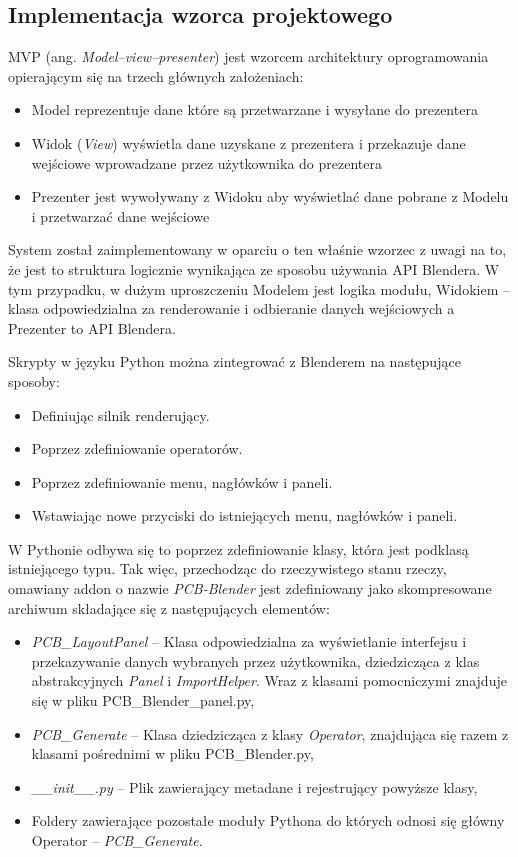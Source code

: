 \documentclass[brudnopis]{xmgr}
\begin{document}
\subsection{Implementacja wzorca projektowego} \label{mvp}
MVP (ang. \emph{Model–view–presenter}) jest wzorcem architektury oprogramowania opierającym się na trzech głównych założeniach:\cite{mvp}
\begin{itemize}
\item Model reprezentuje dane które są przetwarzane i wysyłane do prezentera
\item Widok (\emph{View}) wyświetla dane uzyskane z prezentera i przekazuje dane wejściowe wprowadzane przez użytkownika do prezentera
\item Prezenter jest wywoływany z Widoku aby wyświetlać dane pobrane z Modelu i przetwarzać dane wejściowe
\end{itemize}
System został zaimplementowany w oparciu o ten właśnie wzorzec z uwagi na to, że jest to struktura logicznie wynikająca ze sposobu używania API Blendera.
W tym przypadku, w dużym uproszczeniu Modelem jest logika modułu, Widokiem -- klasa odpowiedzialna za renderowanie i odbieranie danych wejściowych a Prezenter to API Blendera.
\newline


Skrypty w języku Python można zintegrować z Blenderem na następujące sposoby:
\begin{itemize}
\item Definiując silnik renderujący.
\item Poprzez zdefiniowanie operatorów.
\item Poprzez zdefiniowanie menu, nagłówków i paneli.
\item Wstawiając nowe przyciski do istniejących menu, nagłówków i paneli.
\end{itemize}
W Pythonie odbywa się to poprzez zdefiniowanie klasy, która jest podklasą istniejącego typu. 
Tak więc, przechodząc do rzeczywistego stanu rzeczy, omawiany addon o nazwie \emph{PCB-Blender} jest zdefiniowany jako skompresowane archiwum składające się z następujących elementów:
\begin{itemize}
\item \emph{PCB\_LayoutPanel} -- Klasa odpowiedzialna za wyświetlanie interfejsu i przekazywanie danych wybranych przez użytkownika, dziedzicząca z klas abstrakcyjnych \emph{Panel} i \emph{ImportHelper}. Wraz z klasami pomocniczymi znajduje się w pliku PCB\_Blender\_panel.py,
\item \emph{PCB\_Generate} -- Klasa dziedzicząca z klasy \emph{Operator}, znajdująca się razem z klasami pośrednimi w pliku PCB\_Blender.py,
\item \emph{\_\_init\_\_.py} -- Plik zawierający metadane i rejestrujący powyższe klasy,
\item Foldery zawierające pozostałe moduły Pythona do których odnosi się główny Operator -- \emph{PCB\_Generate}.
\end{itemize}
\end{document}
